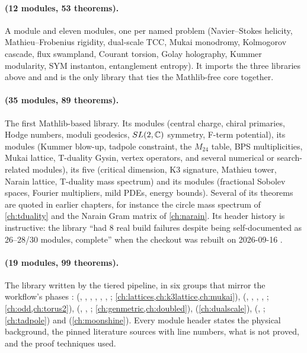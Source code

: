 \paragraph{ (12 modules, 53 theorems).} A 
module and eleven  modules, one per named problem (Navier--Stokes
helicity, Mathieu--Frobenius rigidity, dual-scale TCC, Mukai monodromy, Kolmogorov cascade,
flux swampland, Courant torsion, Golay holography, Kummer modularity, SYM instanton,
entanglement entropy). It imports the three libraries above and 
and is the only library that ties the Mathlib-free core together.

\paragraph{ (35 modules, 89 theorems).} The first
Mathlib-based library. Its  modules (central charge, chiral primaries,
Hodge numbers, moduli geodesics, $SL(2,\mathbb{C})$ symmetry, F-term potential), its
 modules (Kummer blow-up, tadpole constraint, the $M_{24}$ table,
BPS multiplicities, Mukai lattice, T-duality Gysin, vertex operators, and several numerical
or search-related modules), its five  (critical dimension, K3 signature,
Mathieu tower, Narain lattice, T-duality mass spectrum) and its  modules
(fractional Sobolev spaces, Fourier multipliers, mild PDEs, energy bounds). Several of its
theorems are quoted in earlier chapters, for instance the circle mass spectrum of
\cref{ch:tduality} and the Narain Gram matrix of \cref{ch:narain}. Its header history is
instructive: the library ``had 8 real build failures despite being self-documented as
26--28/30 modules, complete'' when the checkout was rebuilt on 2026-09-16
.

\paragraph{ (19 modules, 99 theorems).} The library written by the
tiered pipeline, in six groups that mirror the workflow's phases :  (, , , ,
, , ; \cref{ch:lattices,ch:k3lattice,ch:mukai}),
 (, , , ,
; \cref{ch:odd,ch:torus2}),  (,
, ; \cref{ch:genmetric,ch:doubled}),
 (\cref{ch:dualscale}),  (,
; \cref{ch:tadpole}) and  (\cref{ch:moonshine}). Every
module header states the physical background, the pinned literature sources with line
numbers, what is not proved, and the proof techniques used.


